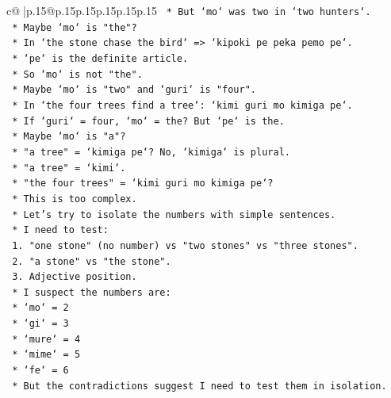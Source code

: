 \documentclass{article}
\begin{document}
{\begin{supertabular}{c@{$\;$}|p{.15\linewidth}@{}p{.15\linewidth}p{.15\linewidth}p{.15\linewidth}p{.15\linewidth}p{.15\linewidth}}
{{{\texttt{                *   But `mo` was two in `two hunters`.} \\
\texttt{                *   Maybe `mo` is "the"?} \\
\texttt{                *   In `the stone chase the bird` => `kipoki pe peka pemo pe`.} \\
\texttt{                *   `pe` is the definite article.} \\
\texttt{                *   So `mo` is not "the".} \\
\texttt{                *   Maybe `mo` is "two" and `guri` is "four".} \\
\texttt{                *   In `the four trees find a tree`: `kimi guri mo kimiga pe`.} \\
\texttt{                *   If `guri` = four, `mo` = the? But `pe` is the.} \\
\texttt{                *   Maybe `mo` is "a"?} \\
\texttt{                *   "a tree" = `kimiga pe`? No, `kimiga` is plural.} \\
\texttt{                *   "a tree" = `kimi`.} \\
\texttt{                *   "the four trees" = `kimi guri mo kimiga pe`?} \\
\texttt{                *   This is too complex.} \\
\texttt{                *   Let's try to isolate the numbers with simple sentences.} \\
\texttt{                *   I need to test:} \\
\texttt{                    1.  "one stone" (no number) vs "two stones" vs "three stones".} \\
\texttt{                    2.  "a stone" vs "the stone".} \\
\texttt{                    3.  Adjective position.} \\
\texttt{                *   I suspect the numbers are:} \\
\texttt{                    *   `mo` = 2} \\
\texttt{                    *   `gi` = 3} \\
\texttt{                    *   `mure` = 4} \\
\texttt{                    *   `mime` = 5} \\
\texttt{                    *   `fe` = 6} \\
\texttt{                *   But the contradictions suggest I need to test them in isolation.} \\
}}}
\end{supertabular}}
\end{document}
